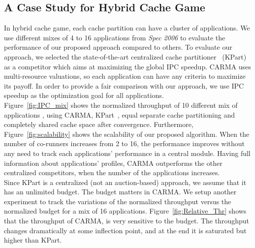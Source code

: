 \vspace{-1\baselineskip}
\subsection{A Case Study for Hybrid Cache Game}
\indent In hybrid cache game, each cache partition can have a cluster of applications. We use different mixes of 4 to 16 applications from \textit{Spec 2006} to evaluate the performance of our proposed approach compared to others. To evaluate our approach, we selected the state-of-the-art centralized cache partitioner~\cite{8327002} (KPart) as a competitor which aims at maximizing the global IPC speedup. CARMA uses multi-resource valuations, so each application can have any criteria to maximize its payoff. In order to provide a fair comparison with our approach, we use IPC speedup as the optimization goal for all applications.\\%
\indent Figure~\ref{fig:IPC_mix} shows the normalized throughput of 10 different mix of applications \cite{srikantaiah2011morphcache}, using CARMA, KPart~\cite{8327002}, equal separate cache partitioning and completely shared cache space after convergence. Furthermore, Figure~\ref{fig:scalability} shows the scalability of our proposed algorithm. When the number of co-runners increases from 2 to 16, the performance improves without any need to track each applications' performance in a central module. Having full information about applications' profiles, CARMA outperforms the other centralized competitors, when the number of the applications increases.\\
\indent Since KPart is a centralized (not an auction-based) approach, we assume that it has an unlimited budget. The budget matters in CARMA. We setup another experiment to track the variations of the normalized throughput versus the normalized budget for a mix of 16 applications. Figure~\ref{fig:Relative_Thr} shows that the throughput of CARMA, is very sensitive to the budget. The throughput changes dramatically at some inflection point, and at the end it is saturated but higher than KPart.

